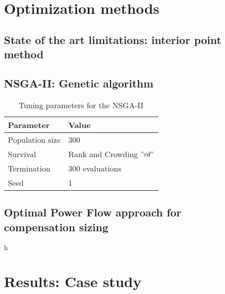 \documentclass[a4paper,11pt, titlepage, twoside]{article}
\begin{document}
\section{Optimization methods}\label{Optimization}

\subsection{State of the art limitations: interior point method}
\subsection{NSGA-II: Genetic algorithm}\label{NSGAII}

\begin{table}[h]
    \centering
    \begin{tabular}{l|l}
    \hline
    \textbf{Parameter} & \textbf{Value} \\ \hline
    Population size & 300 \\ \hline
    Survival & Rank and Crowding $"cd"$ \\ \hline
    Termination  & 300 evaluations \\ \hline
    Seed & 1 \\ \hline
    \end{tabular}
    \caption{Tuning parameters for the NSGA-II}
    \label{tab:NSGAII_parameters}
    \end{table}



\subsection{Optimal Power Flow approach for compensation sizing}
h
\section{Results: Case study}\label{CaseStudies}
\end{document}
